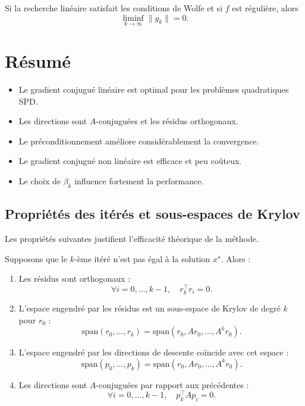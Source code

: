 \begin{theoreme}
Si la recherche linéaire satisfait les conditions de Wolfe et si $f$ est régulière, alors
\[
\liminf_{k\to\infty} \|g_k\| = 0.
\]
\end{theoreme}

\section{Résumé}

\begin{itemize}
  \item Le gradient conjugué linéaire est optimal pour les problèmes quadratiques SPD.
  \item Les directions sont $A$-conjuguées et les résidus orthogonaux.
  \item Le préconditionnement améliore considérablement la convergence.
  \item Le gradient conjugué non linéaire est efficace et peu coûteux.
  \item Le choix de $\beta_k$ influence fortement la performance.
\end{itemize}

\subsection{Propriétés des itérés et sous-espaces de Krylov}

Les propriétés suivantes justifient l'efficacité théorique de la méthode.

\begin{theoreme}
Supposons que le $k$-ème itéré n'est pas égal à la solution $x^\star$. Alors :
\begin{enumerate}
    \item[(i)] Les résidus sont orthogonaux :
    \[ \forall i = 0, \dots, k-1, \quad r_k^\top r_i = 0. \]
    
    \item[(ii)] L'espace engendré par les résidus est un sous-espace de Krylov de degré $k$ pour $r_0$ :
    \[ \mathrm{span}(r_0, \dots, r_k) = \mathrm{span}(r_0, A r_0, \dots, A^k r_0). \]
    
    \item[(iii)] L'espace engendré par les directions de descente coïncide avec cet espace :
    \[ \mathrm{span}(p_0, \dots, p_k) = \mathrm{span}(r_0, A r_0, \dots, A^k r_0). \]
    
    \item[(iv)] Les directions sont $A$-conjuguées par rapport aux précédentes :
    \[ \forall i = 0, \dots, k-1, \quad p_k^\top A p_i = 0. \]
\end{enumerate}
\end{theoreme}

